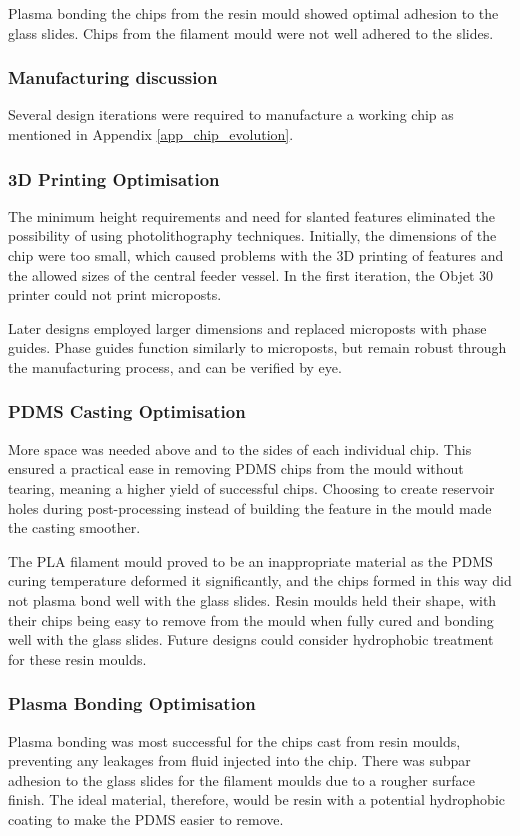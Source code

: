 \documentclass[letterpaper,12pt]{article}
\begin{document}
Plasma bonding the chips from the resin mould showed optimal adhesion to the glass slides. Chips from the filament mould were not well adhered to the slides. 


\subsubsection{Manufacturing discussion}
Several design iterations were required to manufacture a working chip as mentioned in Appendix \ref{app_chip_evolution}. 

\subsubsection{3D Printing Optimisation}
 The minimum height requirements and need for slanted features eliminated the possibility of using photolithography techniques. Initially, the dimensions of the chip were too small, which caused problems with the 3D printing of features and the allowed sizes of the central feeder vessel. In the first iteration, the Objet 30 printer could not print microposts. 
 
 Later designs employed larger dimensions and replaced microposts with phase guides. Phase guides function similarly to microposts, but remain robust through the manufacturing process, and can be verified by eye. 

\subsubsection{PDMS Casting Optimisation}
More space was needed above and to the sides of each individual chip. This ensured a practical ease in removing PDMS chips from the mould without tearing, meaning a higher yield of successful chips. Choosing to create reservoir holes during post-processing instead of building the feature in the mould made the casting smoother. 

The PLA filament mould proved to be an inappropriate material as the PDMS curing temperature deformed it significantly, and the chips formed in this way did not plasma bond well with the glass slides. Resin moulds held their shape, with their chips being easy to remove from the mould when fully cured and bonding well with the glass slides. Future designs could consider hydrophobic treatment for these resin moulds.



\subsubsection{Plasma Bonding Optimisation}
Plasma bonding was most successful for the chips cast from resin moulds, preventing any leakages from fluid injected into the chip. There was subpar adhesion to the glass slides for the filament moulds due to a rougher surface finish. The ideal material, therefore, would be resin with a potential hydrophobic coating to make the PDMS easier to remove. 
\end{document}
